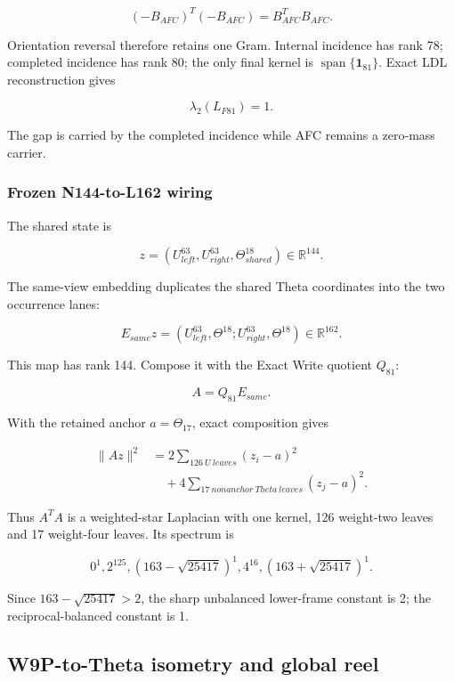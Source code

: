 \[
(-B_{AFC})^T(-B_{AFC})=B_{AFC}^TB_{AFC}.
\]

Orientation reversal therefore retains one Gram. Internal incidence has
rank 78; completed incidence has rank 80; the only final kernel is
\(\operatorname{span}\{\mathbf1_{81}\}\). Exact LDL reconstruction gives

\[
\lambda_2(L_{F81})=1.
\]

The gap is carried by the completed incidence while AFC remains a
zero-mass carrier.

\subsubsection{Frozen N144-to-L162
wiring}\label{viii-ch06-frozen-n144-to-l162-wiring}

The shared state is

\[
z=(U_{left}^{63},U_{right}^{63},\Theta_{shared}^{18})\in\mathbb R^{144}.
\]

The same-view embedding duplicates the shared Theta coordinates into the
two occurrence lanes:

\[
E_{same}z=(U_{left}^{63},\Theta^{18};
           U_{right}^{63},\Theta^{18})\in\mathbb R^{162}.
\]

This map has rank 144. Compose it with the Exact Write quotient
\(Q_{81}\):

\[
A=Q_{81}E_{same}.
\]

With the retained anchor \(a=\Theta_{17}\), exact composition gives

\[
\begin{aligned}
\|Az\|^2
&=2\sum_{126\ U\ leaves}(z_i-a)^2\\
&\quad+4\sum_{17\ nonanchor\ Theta\ leaves}(z_j-a)^2.
\end{aligned}
\]

Thus \(A^TA\) is a weighted-star Laplacian with one kernel, 126
weight-two leaves and 17 weight-four leaves. Its spectrum is

\[
0^1, 2^{125},
(163-\sqrt{25417})^1,
4^{16},
(163+\sqrt{25417})^1.
\]

Since \(163-\sqrt{25417}>2\), the sharp unbalanced lower-frame constant
is 2; the reciprocal-balanced constant is 1.

\subsection{W9P-to-Theta isometry and global
reel}\label{viii-ch06-w9p-to-theta-isometry-and-global-reel}

